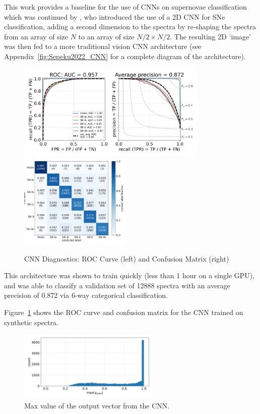 This work provides a baseline for the use of CNNs on supernovae classification 
which was continued by \textcite{Sepeku2022}, who introduced the use of a
2D CNN for SNe classification, adding a second dimension to the spectra by
re-shaping the spectra from an array of size $N$ to an array of size $N/2\times N/2$. 
The resulting 2D `image' was then fed to a more traditional vision 
CNN architecture (see Appendix~\ref{fig:Sepeku2022_CNN} for a complete diagram of the architecture). 
\begin{figure}[t]
    \centering
    \includegraphics[height=4.55cm]{figures/cnn/cnn_rocfull.png}
    \quad
    \includegraphics[height=4.55cm]{figures/cnn/cnn_cmfull.png}
    \caption[CNN diagnostics]{CNN Diagnostics: ROC Curve (left) and Confusion Matrix (right)\label{fig:cnn_qual}}
\end{figure}
This architecture was shown to train quickly (less than 1 hour on a single GPU), 
and was able to classify a validation set of 12888 spectra with an average precision of 0.872
via 6-way categorical classification. 

Figure~\ref{fig:cnn_qual} shows the ROC curve and confusion matrix for the 
CNN trained on synthetic spectra. 
\begin{figure}[t]
    \centering
    \includegraphics[width=0.6\textwidth]{figures/cnn/cnn_max_ypred.png}
    \caption[CNN's Confidence in Classification]{Max value of the output vector from the CNN.\label{fig:cnn_max}}
\end{figure}

